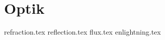 \newpage

\section{Optik}
{refraction.tex}
\newpage
{reflection.tex}
\newpage
{flux.tex}
{enlightning.tex}
